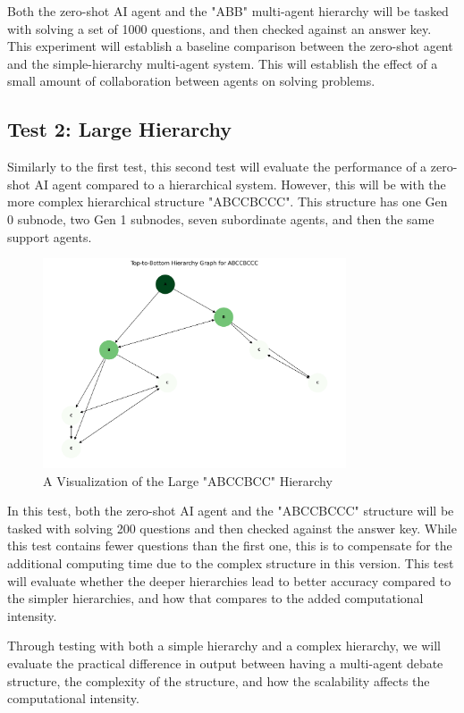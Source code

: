 Both the zero-shot AI agent and the "ABB" multi-agent hierarchy will be tasked with solving a set of 1000 questions, and then checked against an answer key. This experiment will establish a baseline comparison between the zero-shot agent and the simple-hierarchy multi-agent system. This will establish the effect of a small amount of collaboration between agents on solving problems. 

\subsection{Test 2: Large Hierarchy}
Similarly to the first test, this second test will evaluate the performance of a zero-shot AI agent compared to a hierarchical system. However, this will be with the more complex hierarchical structure "ABCCBCCC". This structure has one Gen 0 subnode, two Gen 1 subnodes, seven subordinate agents, and then the same support agents. 

\begin{figure}[h]
    \centering
    \includegraphics[width=0.8\textwidth]{img/section_methodology/ABCCBCCC.png}
    \caption{A Visualization of the Large "ABCCBCC" Hierarchy}
    \label{fig:large}
\end{figure}

In this test, both the zero-shot AI agent and the "ABCCBCCC" structure will be tasked with solving 200 questions and then checked against the answer key. While this test contains fewer questions than the first one, this is to compensate for the additional computing time due to the complex structure in this version. This test will evaluate whether the deeper hierarchies lead to better accuracy compared to the simpler hierarchies, and how that compares to the added computational intensity.

Through testing with both a simple hierarchy and a complex hierarchy, we will evaluate the practical difference in output between having a multi-agent debate structure, the complexity of the structure, and how the scalability affects the computational intensity.

